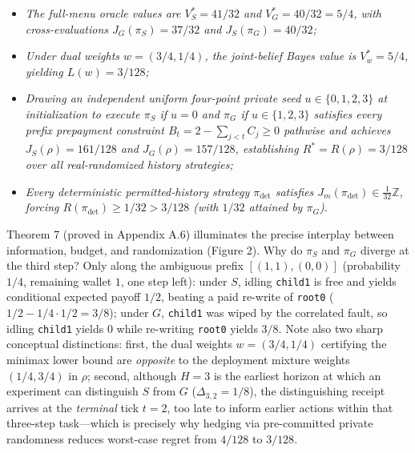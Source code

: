 \documentclass[11pt,a4paper]{article}
\providecommand{\tightlist}{\setlength{\itemsep}{2pt}\setlength{\parskip}{0pt}}
\begin{document}
\begin{enumerate}
  \begin{itemize}
  \tightlist
  \item
    \emph{The full-menu oracle values are \(V_S^* = 41/32\) and
    \(V_G^* = 40/32 = 5/4\), with cross-evaluations
    \(J_G(\pi_S) = 37/32\) and \(J_S(\pi_G) = 40/32\);}
  \item
    \emph{Under dual weights \(w = (3/4, 1/4)\), the joint-belief Bayes
    value is \(V_w^* = 5/4\), yielding \(L(w) = 3/128\);}
  \item
    \emph{Drawing an independent uniform four-point private seed
    \(u \in \{0,1,2,3\}\) at initialization to execute \(\pi_S\) if
    \(u = 0\) and \(\pi_G\) if \(u \in \{1,2,3\}\) satisfies every
    prefix prepayment constraint \(B_t = 2 - \sum_{j<t} C_j \ge 0\)
    pathwise and achieves \(J_S(\rho) = 161/128\) and
    \(J_G(\rho) = 157/128\), establishing \(R^* = R(\rho) = 3/128\) over
    all real-randomized history strategies;}
  \item
    \emph{Every deterministic permitted-history strategy
    \(\pi_{\mathrm{det}}\) satisfies
    \(J_m(\pi_{\mathrm{det}}) \in \frac{1}{32}\mathbb{Z}\), forcing
    \(R(\pi_{\mathrm{det}}) \ge 1/32 > 3/128\) (with \(1/32\) attained
    by \(\pi_G\)).}
  \end{itemize}
\end{enumerate}

Theorem 7 (proved in Appendix A.6) illuminates the precise interplay
between information, budget, and randomization (Figure 2). Why do
\(\pi_S\) and \(\pi_G\) diverge at the third step? Only along the
ambiguous prefix \([(1,1), (0,0)]\) (probability \(1/4\), remaining
wallet \(1\), one step left): under \(S\), idling \texttt{child1} is
free and yields conditional expected payoff \(1/2\), beating a paid
re-write of \texttt{root0} (\(1/2 - 1/4 \cdot 1/2 = 3/8\)); under \(G\),
\texttt{child1} was wiped by the correlated fault, so idling
\texttt{child1} yields \(0\) while re-writing \texttt{root0} yields
\(3/8\). Note also two sharp conceptual distinctions: first, the dual
weights \(w = (3/4, 1/4)\) certifying the minimax lower bound are
\emph{opposite} to the deployment mixture weights \((1/4, 3/4)\) in
\(\rho\); second, although \(H=3\) is the earliest horizon at which an
experiment can distinguish \(S\) from \(G\) (\(\Delta_{3,2} = 1/8\)),
the distinguishing receipt arrives at the \emph{terminal} tick \(t=2\),
too late to inform earlier actions within that three-step task---which
is precisely why hedging via pre-committed private randomness reduces
worst-case regret from \(4/128\) to \(3/128\).
\end{document}
